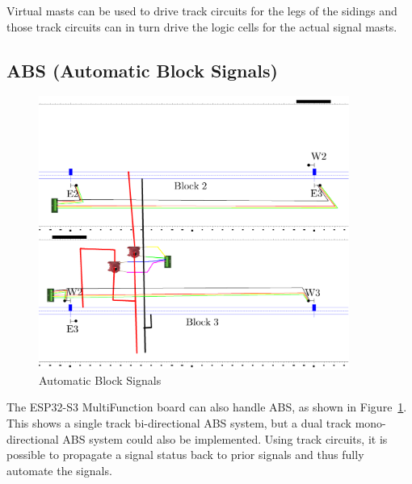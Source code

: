 Virtual masts can be used to drive track circuits for the legs of the sidings
and those track circuits can in turn drive the logic cells for the actual
signal masts.

\subsection{ABS (Automatic Block Signals)}
\label{sec:ABS}
\begin{figure}[hbpt]\begin{centering}%
\includegraphics[width=4in]{ESP32S3-ABSTrack_Stacked.png}
\caption{Automatic Block Signals}
\label{fig:ABSTrackStacked}
\end{centering}\end{figure}

The ESP32-S3 MultiFunction board can also handle ABS, as shown in 
Figure~\ref{fig:ABSTrackStacked}.  This shows a single track bi-directional 
ABS system, but a dual track mono-directional ABS system could also be 
implemented.  Using track circuits, it is possible to propagate a signal 
status back to prior signals and thus fully automate the signals.

